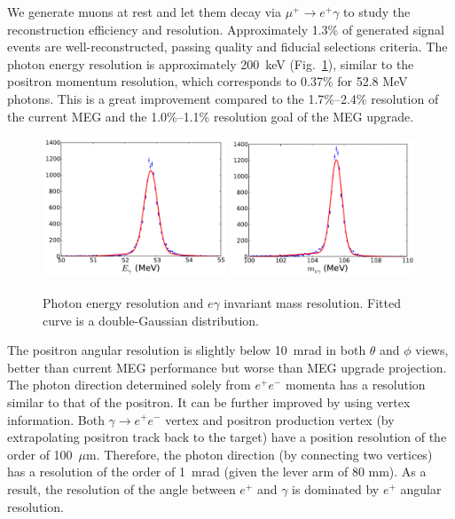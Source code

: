 We generate muons at rest and let them decay via $\mu^+\to e^+\gamma$
to study the reconstruction efficiency and resolution. 
Approximately 1.3\% of generated signal events are well-reconstructed, 
passing quality and fiducial selections criteria. The photon energy resolution 
is approximately 200~keV (Fig.~\ref{fig:eresol}), similar to the positron momentum
resolution, which 
corresponds to 0.37\% for 52.8 MeV photons. This is a great improvement compared 
to the 1.7\%--2.4\% resolution of the current MEG and the 1.0\%--1.1\% resolution 
goal of the MEG upgrade. 

\begin{figure}[ht]
\centering
\includegraphics[width=0.49\textwidth]{Figures/egamma-resol-fit2b.pdf}
\includegraphics[width=0.49\textwidth]{Figures/mumass-resol-fit2b.pdf}
\caption{\label{fig:eresol} Photon energy resolution and $e\gamma$ invariant
mass resolution. Fitted curve is a double-Gaussian distribution.}
\end{figure}


The positron angular resolution is slightly below 10~mrad in both $\theta$ 
and $\phi$ views,
better than current MEG performance but worse than MEG upgrade projection.
The photon direction determined solely from $e^+e^-$ momenta has a resolution
similar to that of the positron. It can be further improved  by using
vertex information. Both $\gamma\to e^+e^-$ vertex and positron production vertex
(by extrapolating positron track back to the target) have a position resolution
of the order of 100~$\mu$m. Therefore, the photon direction (by connecting two
vertices) has a resolution of the order of 1~mrad (given the lever arm of 80 mm).
As a result, the resolution of the angle between $e^+$ and $\gamma$ is dominated
by $e^+$ angular resolution.

